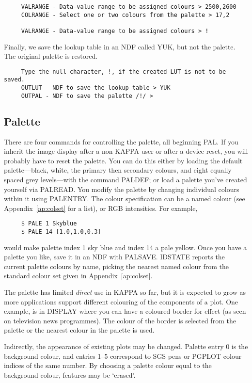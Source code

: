 {\begin{verbatim}
     VALRANGE - Data-value range to be assigned colours > 2500,2600
     COLRANGE - Select one or two colours from the palette > 17,2
 
     VALRANGE - Data-value range to be assigned colours > !
\end{verbatim}
\normalsize
Finally, we save the lookup table in an NDF called YUK, but not the palette.
The original palette is restored.

\small
\begin{verbatim}
     Type the null character, !, if the created LUT is not to be saved.
     OUTLUT - NDF to save the lookup table > YUK
     OUTPAL - NDF to save the palette /!/ >
\end{verbatim}
\normalsize

\subsection{Palette}
There are four commands for controlling the palette, all beginning
PAL. If you inherit the image display after a non-{\small KAPPA}
user or after a device reset, you will probably have to reset the
palette.  You can do this either by loading the default palette---black,
white, the primary then secondary colours, and eight equally spaced
grey levels---with the command PALDEF; or load a palette you've created
yourself via PALREAD.  You modify the palette by changing individual
colours within it using PALENTRY. The colour specification can be a
named colour (see Appendix~\ref{ap:colset} for a list), or RGB
intensities. For example,

\small
\begin{verbatim}
     $ PALE 1 Skyblue
     $ PALE 14 [1.0,1.0,0.3]
\end{verbatim}
\normalsize
would make palette index 1 sky blue and index 14 a pale yellow.  Once
you have a palette you like, save it in an NDF with PALSAVE.  IDSTATE
reports the current palette colours by name, picking the nearest named
colour from the standard colour set given in Appendix~\ref{ap:colset}.

The palette has limited {\em direct\/} use in {\small KAPPA} so far, but
it is expected to grow as more applications support different colouring of
the components of a plot.  One example, is in DISPLAY where you can
have a coloured border for effect (as seen on television news programmes).
The colour of the border is selected from the palette or the nearest
colour in the palette is used.

Indirectly, the appearance of existing plots may be changed.  Palette
entry 0 is the background colour, and entries 1--5 correspond to SGS pens
or PGPLOT colour indices of the same number.  By choosing a palette
colour equal to the background colour, features may be `erased'.

}
